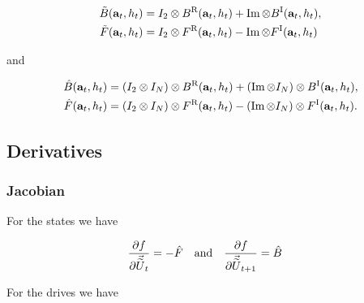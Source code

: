\documentclass{article}
\newcommand{\isovecU}{\vec{\widetilde{U}}}
\newcommand{\BR}{B^{\text{R}}}
\newcommand{\BI}{B^{\text{I}}}
\newcommand{\FR}{F^{\text{R}}}
\newcommand{\FI}{F^{\text{I}}}
\begin{document}
\begin{align*}
  \tilde B(\vb{a}_t, h_t) &= I_2 \otimes \BR(\vb{a}_t, h_t) + \Im \otimes \BI(\vb{a}_t, h_t), \\
  \tilde F(\vb{a}_t, h_t) &= I_2 \otimes \FR(\vb{a}_t, h_t) - \Im \otimes \FI(\vb{a}_t, h_t)
\end{align*}

\noindent
and 

\begin{align*}
  \hat B(\vb{a}_t, h_t) &= \qty(I_2 \otimes I_N) \otimes \BR(\vb{a}_t, h_t) + \qty(\Im \otimes I_N) \otimes \BI(\vb{a}_t, h_t), \\
  \hat F(\vb{a}_t, h_t) &= \qty(I_2 \otimes I_N) \otimes \FR(\vb{a}_t, h_t) - \qty(\Im \otimes I_N) \otimes \FI(\vb{a}_t, h_t). 
\end{align*}



\newpage
\subsection{Derivatives}

\subsubsection*{Jacobian}

For the states we have

\begin{align*}
  \pdv{f}{\isovecU_t} &= - \hat F \quad \text{and} \quad
  \pdv{f}{\isovecU_{t+1}} = \hat B
\end{align*}


For the drives we have
\end{document}
